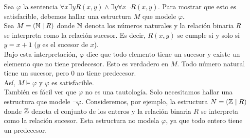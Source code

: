 \message{ !name(main.tex)}\documentclass[12pt,a4paper]{book}
\begin{document}
    \begin{ejemplo}\label{ej:satisfacible-sucesor}
        Sea $\varphi$ la sentencia $\forall x\exists yR(x,y)\wedge\exists y\forall x\neg R(x,y)$. Para mostrar que esto es
        satisfacible, debemos hallar una estructura $M$ que modele $\varphi$.\\
        Sea $M=(\mathbb{N}\mid R)$ donde $\mathbb{N}$ denota los números naturales y la relación binaria $R$ se interpreta como la relación
        sucesor. Es decir, $R(x,y)$ se cumple si y solo si $y=x+1$ ($y$ es el sucesor de $x$).\\
        Bajo esta interpretación, $\varphi$ dice que todo elemento tiene un sucesor y existe un elemento que no tiene
        predecesor. Esto es verdadero en $M$. Todo número natural tiene un sucesor, pero 0 no tiene predecesor.\\
        Así, $M\models\varphi$ y $\varphi$ es satisfacible.\\
        También es fácil ver que $\varphi$ no es una tautología. Solo necesitamos hallar una estructura que modele
        $\neg\varphi$. Consideremos, por ejemplo, la estructura $N=(\mathbb{Z}\mid R)$ donde $\mathbb{Z}$ denota el conjunto de los enteros
        y la relación binaria $R$ se interpreta como la relación sucesor. Esta estructura no modela $\varphi$, ya que todo
        entero tiene un predecesor.
    \end{ejemplo}
\end{document}
